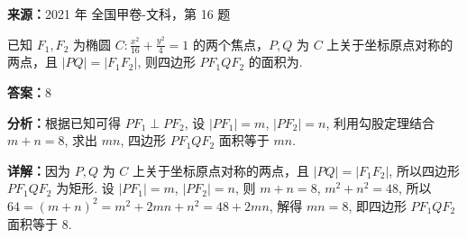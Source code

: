 \begin{question}[points=5]
\textbf{来源：}2021 年 全国甲卷-文科，第 16 题\par
已知 $F_1, F_2$ 为椭圆 $C: \frac{x^2}{16} + \frac{y^2}{4} = 1$ 的两个焦点，$P, Q$ 为 $C$ 上关于坐标原点对称的两点，且 $|PQ| = |F_1F_2|$, 则四边形 $PF_1QF_2$ 的面积为.
\fillin[{$8$}]
\begin{solution}
\textbf{答案：}$8$

\textbf{分析：}根据已知可得 $PF_1 \perp PF_2$, 设 $|PF_1| = m$, $|PF_2| = n$, 利用勾股定理结合 $m+n=8$, 求出 $mn$, 四边形 $PF_1QF_2$ 面积等于 $mn$.

\textbf{详解：}因为 $P, Q$ 为 $C$ 上关于坐标原点对称的两点，且 $|PQ| = |F_1F_2|$, 所以四边形 $PF_1QF_2$ 为矩形. 设 $|PF_1| = m$, $|PF_2| = n$, 则 $m+n=8$, $m^2+n^2=48$, 所以 $64 = (m+n)^2 = m^2 + 2mn + n^2 = 48 + 2mn$, 解得 $mn=8$, 即四边形 $PF_1QF_2$ 面积等于 $8$.
\end{solution}
\end{question}

